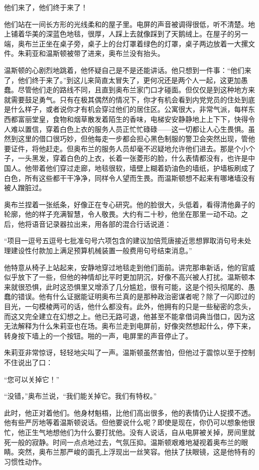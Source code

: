 他们来了，他们终于来了！

他们站在一间长方形的光线柔和的屋子里。电屏的声音被调得很低，听不清楚。地上铺着华美的深蓝色地毯，很厚，人踩上去就像踩到了天鹅绒上。在屋子的另一端，奥布兰正坐在桌子旁，桌子上的台灯罩着绿色的灯罩，桌子两边放着一大摞文件。朱莉亚和温斯顿被带了进来，奥布兰没有抬头。

温斯顿的心剧烈地跳着，他怀疑自己是不是还能讲话。他只想到一件事：``他们来了，他们终于来了。''到这儿来简直太冒失了，更何况还是两个人一起，这更加愚蠢。尽管他们走的路线不同，且直到奥布兰家门口才碰面。但仅仅是到这种地方来就需要鼓足勇气。只有在极其偶然的情况下，你才有机会看到内党党员的住处到底是什么样子，或者说你才有机会穿过他们的居住区。公寓很大，非常气派，每样东西都富丽堂皇，食物和烟草散发着陌生的香味，电梯安安静静地上上下下，快得令人难以置信，穿着白色上衣的服务人员正忙忙碌碌------这一切都让人心生畏惧。虽然到这里的借口很巧妙，但他每走一步都会担心黑色制服的警卫会突然出现，管他要证件，将他赶走。但奥布兰的服务人员却毫不迟疑地允许他们进去。那是个小个子，一头黑发，穿着白色的上衣，长着一张菱形的脸，什么表情都没有，也许是中国人。他带着他们穿过走廊，地毯很软，墙壁上糊着奶油色的墙纸，护墙板刷成了白色，所有这些都干干净净，同样令人望而生畏。而温斯顿想不起来有哪堵墙没有被人蹭脏过。

奥布兰捏着一张纸条，好像正在专心研究。他的脸很大，头低着，看得清他鼻子的轮廓，他的样子充满智慧，令人敬畏。大约有二十秒，他坐在那里一动不动。之后，他将语音记录器拉出来，用各部的混合行话说道：

``项目一逗号五逗号七批准句号六项包含的建议加倍荒唐接近思想罪取消句号未处理建设性付款加上满足预算机械装置一般费用句号结束消息。''

他特意从椅子上站起来，安静地穿过地毯走到他们面前。讲完那串新话，他的官威似乎放下了一些，但他的神情却比平时更加阴沉，好像不高兴被人打扰。温斯顿本来就很恐惧，此时这恐惧里又增添了几分尴尬，很有可能，这是个彻头彻尾的、愚蠢的错误。他有什么证据能证明奥布兰真的是那种政治密谋者呢？除了一闪即过的目光，一句模棱两可的话，他什么都没有。此外，他拥有的只是一些秘密的念头，而这又完全建立在幻想之上。他已无路可退，他甚至不能拿借词典当借口，因为这无法解释为什么朱莉亚也在场。奥布兰走到电屏前，好像突然想起什么，停下来，转身按下墙上的一个按钮。啪的一声，电屏里的声音停止了。

朱莉亚非常惊讶，轻轻地尖叫了一声。温斯顿虽然害怕，但他过于震惊以至于控制不住说出了口：

``您可以关掉它！''

``没错，''奥布兰说，``我们能关掉它。我们有特权。''

此时，他正对着他们。他身材魁梧，比他们高出很多，他的表情仍让人捉摸不透。他有些严厉地等着温斯顿说话。但他要说什么呢？即使是现在，你仍可以想象他很忙，他正生气地想他们为什么要打扰他。没有人说话，自从电屏被关掉，房间里就死一般的寂静。时间一点点地过去，气氛压抑。温斯顿艰难地凝视着奥布兰的眼睛。突然，奥布兰那严峻的面孔上浮现出一丝笑容。他扶了扶眼镜，这是他特有的习惯性动作。

